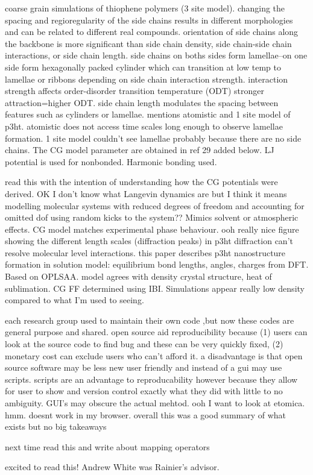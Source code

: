 \documentclass{article}
\begin{document}
\cite{Marsh2014}
coarse grain simulations of thiophene polymers (3 site model). changing the spacing and regioregularity of the side chains results in different morphologies and can be related to different real compounds.
orientation of side chains along the backbone is more significant than side chain density, side chain-side chain interactions, or side chain length. side chains on boths sides form lamellae--on one side form hexagonally packed cylinder which can transition at low temp to lamellae or ribbons depending on side chain interaction strength. interaction strength affects order-disorder transition temperature (ODT) stronger attraction=higher ODT. side chain length modulates the spacing between features such as cylinders or lamellae.
mentions atomistic and 1 site model of p3ht. atomistic does not access time scales long enough to observe lamellae formation. 1 site model couldn't see lamellae probably because there are no side chains.
The CG model parameter are obtained in ref 29 added below. LJ potential is used for nonbonded. Harmonic bonding used.

\cite{Schwarz2013}
read this with the intention of understanding how the CG potentials were derived.
OK I don't know what Langevin dynamics are but I think it means modelling molecular systems with reduced degrees of freedom and accounting for omitted dof using random kicks to the system?? Mimics solvent or atmospheric effects.
CG model matches experimental phase behaviour. 
ooh really nice figure showing the different length scales (diffraction peaks) in p3ht
diffraction can't resolve molecular level interactions.
this paper describes p3ht nanostructure formation in solution
model: equilibrium bond lengths, angles, charges from DFT. Based on OPLSAA. model agrees with density crystal structure, heat of sublimation. CG FF determined using IBI.
Simulations appear really low density compared to what I'm used to seeing.

\cite{Cummings2019}

each research group used to maintain their own code ,but now these codes are general purpose and shared. open source aid reproducibility because (1) users can look at the source code to find bug and these can be very quickly fixed, (2) monetary cost can exclude users who can't afford it.
a disadvantage is that open source software may be less new user friendly and instead of a gui may use scripts. scripts are an advantage to reproducability however because they allow for user to show and version control exactly what they did with little to no ambiguity. GUI's may obscure the actual mehtod.
ooh I want to look at etomica. hmm. doesnt work in my browser.
overall this was a good summary of what exists but no big takeaways

\cite{Zhang2008}

next time read this and write about mapping operators


\cite{Cao2015a}


\cite{li2020}
excited to read this! Andrew White was Rainier's advisor.




\end{document}
